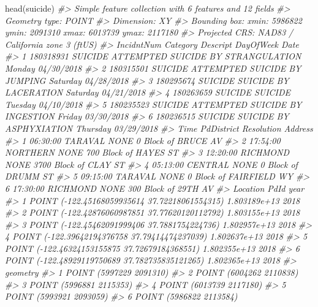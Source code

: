 \documentclass[
]{krantz}
\makeatletter
\newenvironment{Shaded}{\begin{snugshade}}{\end{snugshade}}
\newcommand{\CommentTok}[1]{\textcolor[rgb]{0.37,0.37,0.37}{\textit{#1}}}
\newcommand{\FunctionTok}[1]{\textcolor[rgb]{0,0,0}{#1}}
\newcommand{\NormalTok}[1]{#1}
\newenvironment{kframe}{%
\medskip{}
\setlength{\fboxsep}{.8em}
 \def\at@end@of@kframe{}%
 \ifinner\ifhmode%
  \def\at@end@of@kframe{\end{minipage}}%
  \begin{minipage}{\columnwidth}%
 \fi\fi%
 \def\FrameCommand##1{\hskip\@totalleftmargin \hskip-\fboxsep
 \colorbox{shadecolor}{##1}\hskip-\fboxsep
     \hskip-\linewidth \hskip-\@totalleftmargin \hskip\columnwidth}%
 \MakeFramed {\advance\hsize-\width
   \@totalleftmargin\z@ \linewidth\hsize
   \@setminipage}}%
 {\par\unskip\endMakeFramed%
 \at@end@of@kframe}
\renewenvironment{Shaded}{\begin{kframe}}{\end{kframe}}
\makeatother
\begin{document}
\begin{Shaded}
\begin{Highlighting}[]
\FunctionTok{head}\NormalTok{(suicide)}
\CommentTok{\#\textgreater{} Simple feature collection with 6 features and 12 fields}
\CommentTok{\#\textgreater{} Geometry type: POINT}
\CommentTok{\#\textgreater{} Dimension:     XY}
\CommentTok{\#\textgreater{} Bounding box:  xmin: 5986822 ymin: 2091310 xmax: 6013739 ymax: 2117180}
\CommentTok{\#\textgreater{} Projected CRS: NAD83 / California zone 3 (ftUS)}
\CommentTok{\#\textgreater{}   IncidntNum Category                           Descript DayOfWeek       Date}
\CommentTok{\#\textgreater{} 1  180318931  SUICIDE ATTEMPTED SUICIDE BY STRANGULATION    Monday 04/30/2018}
\CommentTok{\#\textgreater{} 2  180315501  SUICIDE       ATTEMPTED SUICIDE BY JUMPING  Saturday 04/28/2018}
\CommentTok{\#\textgreater{} 3  180295674  SUICIDE              SUICIDE BY LACERATION  Saturday 04/21/2018}
\CommentTok{\#\textgreater{} 4  180263659  SUICIDE                            SUICIDE   Tuesday 04/10/2018}
\CommentTok{\#\textgreater{} 5  180235523  SUICIDE     ATTEMPTED SUICIDE BY INGESTION    Friday 03/30/2018}
\CommentTok{\#\textgreater{} 6  180236515  SUICIDE            SUICIDE BY ASPHYXIATION  Thursday 03/29/2018}
\CommentTok{\#\textgreater{}       Time PdDistrict Resolution                 Address}
\CommentTok{\#\textgreater{} 1 06:30:00    TARAVAL       NONE     0 Block of BRUCE AV}
\CommentTok{\#\textgreater{} 2 17:54:00   NORTHERN       NONE   700 Block of HAYES ST}
\CommentTok{\#\textgreater{} 3 12:20:00   RICHMOND       NONE   3700 Block of CLAY ST}
\CommentTok{\#\textgreater{} 4 05:13:00    CENTRAL       NONE     0 Block of DRUMM ST}
\CommentTok{\#\textgreater{} 5 09:15:00    TARAVAL       NONE 0 Block of FAIRFIELD WY}
\CommentTok{\#\textgreater{} 6 17:30:00   RICHMOND       NONE    300 Block of 29TH AV}
\CommentTok{\#\textgreater{}                                         Location         PdId year}
\CommentTok{\#\textgreater{} 1  POINT ({-}122.45168059935614 37.72218061554315) 1.803189e+13 2018}
\CommentTok{\#\textgreater{} 2  POINT ({-}122.42876060987851 37.77620120112792) 1.803155e+13 2018}
\CommentTok{\#\textgreater{} 3   POINT ({-}122.45462091999406 37.7881754224736) 1.802957e+13 2018}
\CommentTok{\#\textgreater{} 4  POINT ({-}122.39642194376758 37.79414474237039) 1.802637e+13 2018}
\CommentTok{\#\textgreater{} 5  POINT ({-}122.46324153155875 37.72679184368551) 1.802355e+13 2018}
\CommentTok{\#\textgreater{} 6 POINT ({-}122.48929119750689 37.782735835121265) 1.802365e+13 2018}
\CommentTok{\#\textgreater{}                  geometry}
\CommentTok{\#\textgreater{} 1 POINT (5997229 2091310)}
\CommentTok{\#\textgreater{} 2 POINT (6004262 2110838)}
\CommentTok{\#\textgreater{} 3 POINT (5996881 2115353)}
\CommentTok{\#\textgreater{} 4 POINT (6013739 2117180)}
\CommentTok{\#\textgreater{} 5 POINT (5993921 2093059)}
\CommentTok{\#\textgreater{} 6 POINT (5986822 2113584)}
\end{Highlighting}
\end{Shaded}
\end{document}

